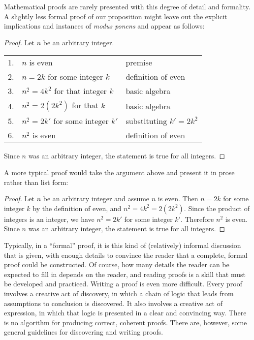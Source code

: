 Mathematical proofs are rarely presented with this degree of detail and formality.
A slightly less formal proof of our proposition might leave out 
the explicit implications and instances
of \textit{modus ponens} and appear as follows:
\begin{proof}
Let $n$ be an arbitrary integer.

\begin{center}
  \begin{tabular}{r@{\ \ }l@{\qquad}l}
1.&$n$ is even & premise \\
2.&$n=2k$ for some integer $k$ & definition of even\\
3.&$n^2=4k^2$ for that integer $k$ & basic algebra\\
4.&$n^2=2(2k^2)$ for that $k$ & basic algebra\\
5.&$n^2 = 2k'$ for some integer $k'$  & substituting $k'=2k^2$\\
6.&$n^2$ is even & definition of even\\
\end{tabular}
\end{center}
Since $n$ was an arbitrary integer, the statement is true for all integers.
\end{proof} 

A more typical proof would take the argument above and present it in prose
rather than list form: 
\begin{proof}
Let $n$ be an arbitrary integer and assume $n$ is even.  Then
$n=2k$ for some integer $k$ by the definition of even, and $n^2=4k^2=2(2k^2)$. 
Since the product of integers is an integer, we have $n^2=2k'$ for some integer
$k'$.  Therefore $n^2$ is even.  Since $n$ was an arbitrary integer, the statement
is true for all integers.
\end{proof}

Typically, in a ``formal'' proof, it is this
kind of (relatively) informal discussion that is
given, with enough details to convince the reader that a complete,
formal proof could be constructed.  Of course, how many details
the reader can be expected to fill in depends on the reader,
and reading proofs is a skill that must be developed and
practiced.  Writing a proof is even more difficult.  Every
proof involves a creative act of discovery, in which a
chain of logic that leads from assumptions to conclusion is
discovered.  It also involves a creative act of expression,
in which that logic is presented in a clear and convincing way.
There is no algorithm for producing correct, coherent proofs.
There are, however, some general guidelines
for discovering
and writing proofs.

